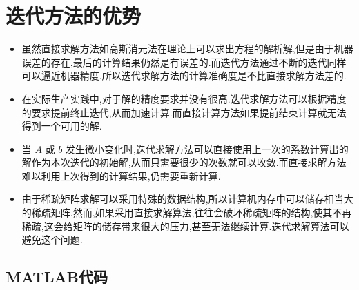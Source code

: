 \documentclass[a4paper]{article}
\numberwithin{equation}{section}
\begin{document}
\section{迭代方法的优势}
\begin{itemize}
    \item 虽然直接求解方法如高斯消元法在理论上可以求出方程的解析解,但是由于机器误差的存在,最后的计算结果仍然是有误差的.而迭代方法通过不断的迭代同样可以逼近机器精度.所以迭代求解方法的计算准确度是不比直接求解方法差的.
    \item 在实际生产实践中,对于解的精度要求并没有很高.迭代求解方法可以根据精度的要求提前终止迭代,从而加速计算.而直接计算方法如果提前结束计算就无法得到一个可用的解.
    \item 当 $A$ 或 $b$ 发生微小变化时,迭代求解方法可以直接使用上一次的系数计算出的解作为本次迭代的初始解,从而只需要很少的次数就可以收敛.而直接求解方法难以利用上次得到的计算结果,仍需要重新计算.
    \item 由于稀疏矩阵求解可以采用特殊的数据结构,所以计算机内存中可以储存相当大的稀疏矩阵.然而,如果采用直接求解算法,往往会破坏稀疏矩阵的结构,使其不再稀疏,这会给矩阵的储存带来很大的压力,甚至无法继续计算.迭代求解算法可以避免这个问题.
\end{itemize}


\clearpage
\begin{appendices}
    \section{MATLAB代码}
    
    
    
    
\end{appendices}
\end{document}
